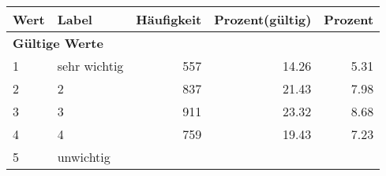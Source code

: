     \begin{longtable}{lXrrr}
     \toprule
     \textbf{Wert} & \textbf{Label} & \textbf{Häufigkeit} & \textbf{Prozent(gültig)} & \textbf{Prozent} \\
     \endhead
     \midrule
     \multicolumn{5}{l}{\textbf{Gültige Werte}}\\

     1 &
     \multicolumn{1}{X}{ sehr wichtig   } &


       \num{557} &
       \num[round-mode=places,round-precision=2]{14,26} &
         \num[round-mode=places,round-precision=2]{5,31} \\

     2 &
     \multicolumn{1}{X}{ 2   } &


       \num{837} &
       \num[round-mode=places,round-precision=2]{21,43} &
         \num[round-mode=places,round-precision=2]{7,98} \\

     3 &
     \multicolumn{1}{X}{ 3   } &


       \num{911} &
       \num[round-mode=places,round-precision=2]{23,32} &
         \num[round-mode=places,round-precision=2]{8,68} \\

     4 &
     \multicolumn{1}{X}{ 4   } &


       \num{759} &
       \num[round-mode=places,round-precision=2]{19,43} &
         \num[round-mode=places,round-precision=2]{7,23} \\

     5 &
     \multicolumn{1}{X}{ unwichtig   } &



\end{longtable}
